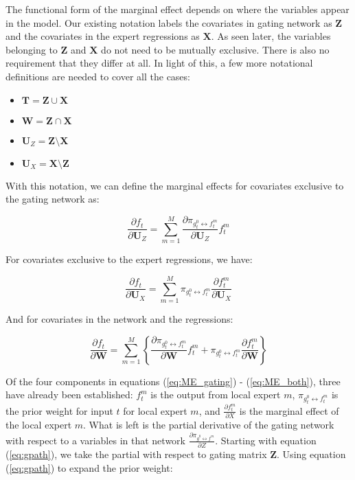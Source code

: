 \documentclass[12pt]{article}
\newcommand{\gateprod}[2]{\pi_{#1 \longleftrightarrow #2}}
\begin{document}
The functional form of the marginal effect depends on where the variables
appear in the model. Our existing notation labels the covariates in gating
network as $\boldsymbol{Z}$ and the covariates in the expert regressions 
as $\boldsymbol{X}$. As seen later, the variables belonging to
$\boldsymbol{Z}$ and $\boldsymbol{X}$ do not need to be mutually
exclusive. There is also no requirement that they differ at all.
In light of this, a few more notational definitions are needed to cover
all the cases:

\begin{itemize}  
  \item $\boldsymbol{T} = \boldsymbol{Z} \cup \boldsymbol{X}$
  \item $\boldsymbol{W} = \boldsymbol{Z} \cap \boldsymbol{X}$
  \item $\boldsymbol{U}_{Z} = \boldsymbol{Z} \setminus \boldsymbol{X}$
  \item $\boldsymbol{U}_{X} = \boldsymbol{X} \setminus \boldsymbol{Z}$
\end{itemize}


With this notation, we can define the marginal effects for covariates exclusive
to the gating network as:

\begin{equation} \label{eq:ME_gating}
  \frac{\partial f_{t}}{\partial \boldsymbol{U}_{Z}} = \sum_{m=1}^{M} \frac{\partial \gateprod{g^{0}_{t}}{f^{m}_{t}}}{{\partial \boldsymbol{U}_{Z}}}f^{m}_{t}
\end{equation}

For covariates exclusive to the expert regressions, we have:

\begin{equation} \label{eq:ME_expert}
  \frac{\partial f_{t}}{\partial \boldsymbol{U}_{X}} = \sum_{m=1}^{M} \gateprod{g^{0}_{t}}{f^{m}_{t}} \frac{\partial f^{m}_{t}}{{\partial \boldsymbol{U}_{X}}}
\end{equation}

And for covariates in the network and the regressions:

\begin{equation} \label{eq:ME_both}
  \frac{\partial f_{t}}{\partial \boldsymbol{W}} = \sum_{m=1}^{M} \left\{ \frac{\partial \gateprod{g^{0}_{t}}{f^{m}_{t}}}{{\partial \boldsymbol{W}}}f^{m}_{t} + \gateprod{g^{0}_{t}}{f^{m}_{t}} \frac{\partial f^{m}_{t}}{{\partial \boldsymbol{W}}} \right\}
\end{equation}

Of the four components in equations (\ref{eq:ME_gating}) - (\ref{eq:ME_both}),
three have already been established: $f_{t}^{m}$ is the output from local
expert $m$, $\gateprod{g^{0}_{t}}{f^{m}_{t}}$ is the prior weight for
input $t$ for local expert $m$, and $\frac{\partial f^{m}_{t}}{{\partial X}}$
is the marginal effect of the local expert $m$. What is left is the
partial derivative of the gating network with respect to a variables
in that network $\frac{\partial \gateprod{g^{0}}{f^{m}}}{\partial Z}$.
Starting with equation (\ref{eq:gpath}), we take the partial with
respect to gating matrix $\boldsymbol{Z}$. Using equation (\ref{eq:gpath})
to expand the prior weight:
\end{document}
